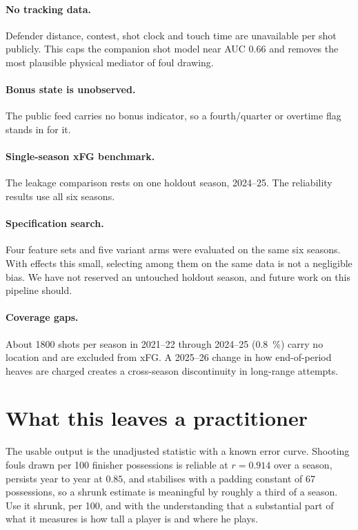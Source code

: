 \documentclass[11pt,a4paper]{article}
\begin{document}
\paragraph{No tracking data.} Defender distance, contest, shot clock and touch
time are unavailable per shot publicly. This caps the companion shot model near
AUC 0.66 \citep{cervone2016multiresolution} and removes the most plausible
physical mediator of foul drawing.

\paragraph{Bonus state is unobserved.} The public feed carries no bonus indicator,
so a fourth\-/quarter or overtime flag stands in for it.

\paragraph{Single-season xFG benchmark.} The leakage comparison rests on one
holdout season, 2024--25. The reliability results use all six seasons.

\paragraph{Specification search.} Four feature sets and five variant arms were
evaluated on the same six seasons. With effects this small, selecting among them
on the same data is not a negligible bias. We have not reserved an untouched
holdout season, and future work on this pipeline should.

\paragraph{Coverage gaps.} About \num{1800} shots per season in 2021--22 through
2024--25 (\SI{0.8}{\percent}) carry no location and are excluded from xFG. A
2025--26 change in how end-of-period heaves are charged creates a cross-season
discontinuity in long-range attempts.

\section{What this leaves a practitioner}

The usable output is the unadjusted statistic with a known error curve. Shooting
fouls drawn per 100 finisher possessions is reliable at $r = 0.914$ over a
season, persists year to year at $0.85$, and stabilises with a padding constant of
67 possessions, so a shrunk estimate is meaningful by roughly a third of a season.
Use it shrunk, per 100, and with the understanding that a substantial part of what
it measures is how tall a player is and where he plays.
\end{document}
